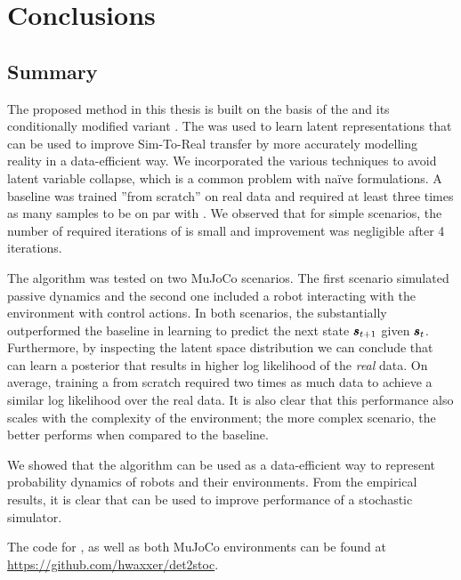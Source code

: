 \chapter{Conclusions}
\label{conclusions}

\section{Summary}

The proposed method in this thesis is built on the basis of the \vae{} and its conditionally modified variant \cvae{}. The \cvae{} was used to learn latent representations that can be used to improve Sim-To-Real transfer by more accurately modelling reality in a data-efficient way. We incorporated the various techniques to avoid latent variable collapse, which is a common problem with naïve \cvae{} formulations. A baseline \cvae{} was trained ''from scratch'' on real data and required at least three times as many samples to be on par with \dettostoc{}. We observed that for simple scenarios, the number of required iterations of \dettostoc{} is small and improvement  was negligible after 4 iterations.

The \dettostoc{} algorithm was tested on two MuJoCo scenarios. The first scenario simulated passive dynamics and the second one included a robot interacting with the environment with control actions. In both scenarios, the \dettostoc{} substantially outperformed the baseline in learning to predict the next state $\pmb{s}_{t+1}$ given $\pmb{s}_t$. Furthermore, by inspecting the latent space distribution we can conclude that \dettostoc{} can learn a posterior that results in higher log likelihood of the \emph{real} data. On average, training a \cvae{} from scratch required two times as much data to achieve a similar log likelihood over the real data. It is also clear that this performance also scales with the complexity of the environment; the more complex scenario, the better \dettostoc{} performs when compared to the baseline.

We showed that the \dettostoc{} algorithm can be used as a data-efficient way to represent probability dynamics of robots and their environments. From the empirical results, it is clear that \dettostoc{} can be used to improve performance of a stochastic simulator.

The code for \dettostoc{}, as well as both MuJoCo environments can be found at \url{https://github.com/hwaxxer/det2stoc}. 


